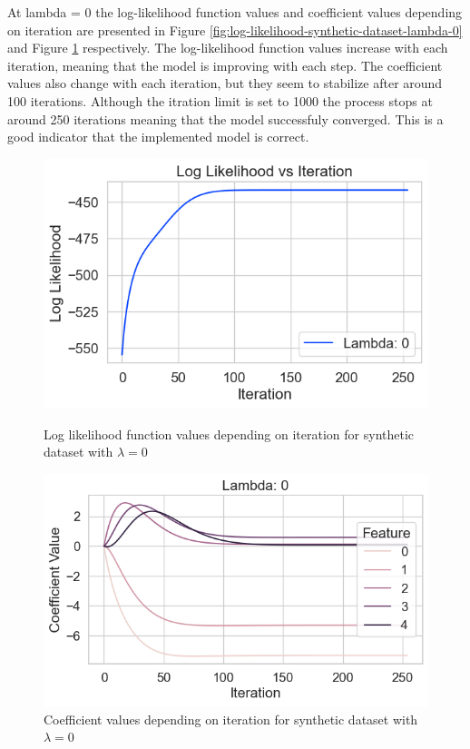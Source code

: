 \documentclass[12pt]{article}
\begin{document}
At lambda = 0 the log-likelihood function values and coefficient values depending on iteration are presented in Figure \ref{fig:log-likelihood-synthetic-dataset-lambda-0} and Figure \ref{fig:coefficients-synthetic-dataset-lambda-0} respectively. The log-likelihood function values increase with each iteration, meaning that the model is improving with each step. The coefficient values also change with each iteration, but they seem to stabilize after around 100 iterations. Although the itration limit is set to 1000 the process stops at around 250 iterations meaning that the model successfuly converged. This is a good indicator that the implemented model is correct.\par


\begin{figure}[h]
    \centering
    \begin{minipage}{0.48\textwidth}
        \centering
        \includegraphics[width=\textwidth]{../results/log_likelihood_synthetic_dataset_lambda_0.png}
        \caption{Log likelihood function values depending on iteration for synthetic dataset with $\lambda=0$}
        \label{fig:log-likelihood-synthetic-dataset-lambda-0}
    \end{minipage}
    \hfill
    \begin{minipage}{0.48\textwidth}
        \centering
        \includegraphics[width=\textwidth]{../results/coefficients_synthetic_dataset_lambda_0.png}
        \caption{Coefficient values depending on iteration for synthetic dataset with $\lambda=0$}
        \label{fig:coefficients-synthetic-dataset-lambda-0}
    \end{minipage}
\end{figure}
\end{document}
